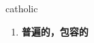 
\begin{frame}
{\huge catholic}
\begin{center}
\begin{enumerate}\Large
  \item \textbf{普遍的，包容的}
\end{enumerate}
\end{center}
\end{frame}
